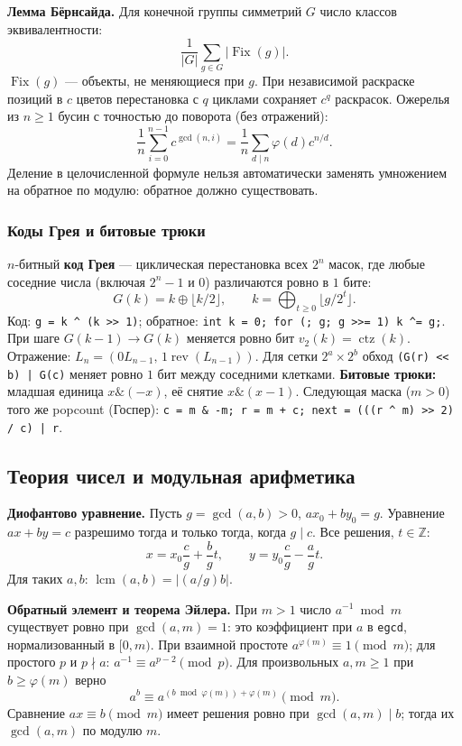 \textbf{Лемма Бёрнсайда.} Для конечной группы симметрий $G$ число классов эквивалентности:
\[
  \frac{1}{|G|}\sum_{g\in G}|\operatorname{Fix}(g)|.
\]
$\operatorname{Fix}(g)$ --- объекты, не меняющиеся при $g$. При независимой раскраске позиций в $c$ цветов перестановка с $q$ циклами сохраняет $c^q$ раскрасок. Ожерелья из $n\ge1$ бусин с точностью до поворота (без отражений):
\[
  \frac1n\sum_{i=0}^{n-1} c^{\gcd(n,i)}
  =\frac1n\sum_{d\mid n}\varphi(d)c^{n/d}.
\]
Деление в целочисленной формуле нельзя автоматически заменять умножением на обратное по модулю: обратное должно существовать.

\subsubsection*{Коды Грея и битовые трюки}
$n$-битный \textbf{код Грея} --- циклическая перестановка всех $2^n$ масок, где любые соседние числа (включая $2^n-1$ и $0$) различаются ровно в $1$ бите:
\[
  G(k)=k\oplus\lfloor k/2\rfloor,\qquad
  k=\bigoplus_{t\ge0}\lfloor g/2^t\rfloor.
\]
Код: \texttt{g = k \textasciicircum{} (k >{}> 1)}; обратное: \texttt{int k = 0; for (; g; g >{}>= 1) k \textasciicircum{}= g;}.
При шаге $G(k-1)\to G(k)$ меняется ровно бит $v_2(k)=\operatorname{ctz}(k)$.
Отражение: $L_n=(0L_{n-1},\,1\operatorname{rev}(L_{n-1}))$.
Для сетки $2^a\times2^b$ обход \texttt{(G(r) <{}< b) | G(c)} меняет ровно $1$ бит между соседними клетками.
\textbf{Битовые трюки:} младшая единица $x\mathbin{\&}(-x)$, её снятие $x\mathbin{\&}(x-1)$. Следующая маска ($m>0$) того же popcount (Госпер): \texttt{c = m \& -m; r = m + c; next = (((r \textasciicircum{} m) >{}> 2) / c) | r}.

\subsection{Теория чисел и модульная арифметика}
\textbf{Диофантово уравнение.} Пусть $g=\gcd(a,b)>0$, $ax_0+by_0=g$. Уравнение $ax+by=c$ разрешимо тогда и только тогда, когда $g\mid c$. Все решения, $t\in\mathbb Z$:
\[
  x=x_0\frac cg+\frac bg t,\qquad
  y=y_0\frac cg-\frac ag t.
\]
Для таких $a,b$: $\operatorname{lcm}(a,b)=|(a/g)b|$.

\textbf{Обратный элемент и теорема Эйлера.} При $m>1$ число $a^{-1}\bmod m$ существует ровно при $\gcd(a,m)=1$: это коэффициент при $a$ в \texttt{egcd}, нормализованный в $[0,m)$.
При взаимной простоте $a^{\varphi(m)}\equiv1\pmod m$; для простого $p$ и $p\nmid a$: $a^{-1}\equiv a^{p-2}\pmod p$.
Для произвольных $a,m\ge1$ при $b\ge\varphi(m)$ верно
\[
  a^b\equiv a^{(b\bmod\varphi(m))+\varphi(m)}\pmod m.
\]
Сравнение $ax\equiv b\pmod m$ имеет решения ровно при $\gcd(a,m)\mid b$; тогда их $\gcd(a,m)$ по модулю $m$.

